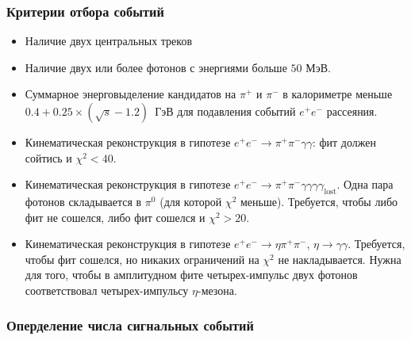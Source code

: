 \documentclass{beamer}
\begin{document}
\begin{frame}
  \frametitle{Критерии отбора событий}
  \scriptsize
  \begin{itemize}
    \item Наличие двух центральных треков
    \item Наличие двух или более фотонов с энергиями больше $50\text{ МэВ}$.
    \item Суммарное энерговыделение кандидатов на $\pi^+$ и $\pi^-$ в калориметре меньше
      $0.4 + 0.25\times(\sqrt{s} - 1.2)$~ГэВ для подавления событий $e^+e^-$ рассеяния.
    \item Кинематическая реконструкция
      в гипотезе $e^+e^-\rightarrow\pi^+\pi^-\gamma\gamma$: фит должен сойтись
      и $\chi^2<40$.
    \item Кинематическая реконструкция в гипотезе $e^+e^-\rightarrow\pi^+\pi^-\gamma\gamma\gamma\gamma_{\text{lost}}$. Одна
      пара фотонов складывается в $\pi^0$ (для которой $\chi^2$ меньше). Требуется, чтобы
      либо фит не сошелся, либо фит сошелся и $\chi^2>20$.
    \item Кинематическая реконструкция в гипотезе $e^+e^-\rightarrow\eta\pi^+\pi^-$, $\eta\rightarrow\gamma\gamma$. Требуется,
      чтобы фит сошелся, но никаких ограничений на $\chi^2$ не накладывается. Нужна
      для того, чтобы в амплитудном фите четырех-импульс двух фотонов
      соответствовал четырех-импульсу $\eta$-мезона.
  \end{itemize}
\end{frame}

\begin{frame}
  \frametitle{Оперделение числа сигнальных событий}
\end{frame}
\end{document}
